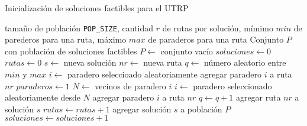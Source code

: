 \begin{algorithm}[!htb]
\caption{Inicialización de soluciones factibles para el UTRP}
\label{alg:inicializacion}
\begin{algorithmic}[1]
\REQUIRE tamaño de población \texttt{POP\_SIZE}, cantidad $r$ de rutas por solución, mímimo $min$ de parederos para una ruta, máximo $max$ de paraderos para una ruta
\ENSURE Conjunto $P$ con población de soluciones factibles
\STATE $P \leftarrow$ conjunto vacío
\STATE $soluciones \leftarrow 0$ 
	\STATE $rutas \leftarrow 0$
	\STATE $s \leftarrow$ nueva solución
		\STATE $nr \leftarrow$ nueva ruta
		\STATE $q \leftarrow$ número aleatorio entre $min$ y $max$
		\STATE $i \leftarrow$ paradero seleccioado aleatoriamente
		\STATE agregar paradero $i$ a ruta $nr$
		\STATE $paraderos \leftarrow 1$
			\STATE $N \leftarrow$ vecinos de paradero $i$
			\STATE $i \leftarrow$ paradero seleccionado aleatoriamente desde $N$
			\STATE agregar paradero $i$ a ruta $nr$			
			\STATE $q \leftarrow q+1$
		\ENDWHILE
		\STATE agregar ruta $nr$ a solución $s$
		\STATE $rutas \leftarrow rutas + 1$
	\ENDWHILE
	\STATE agregar solución $s$ a población $P$
	\STATE $soluciones \leftarrow soluciones+1$
\ENDWHILE
\end{algorithmic}
\end{algorithm}

